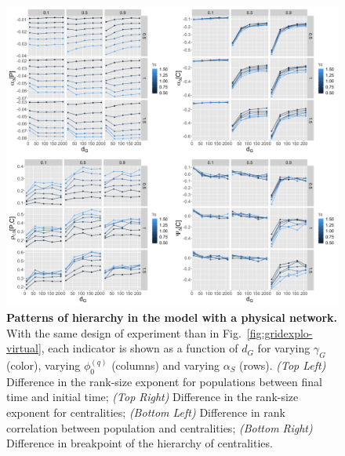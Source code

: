 \documentclass[11pt]{article}
\begin{document}
\begin{figure}
\includegraphics[width=\linewidth]{Fig3.png}
\caption{\textbf{Patterns of hierarchy in the model with a physical network.} With the same design of experiment than in Fig.~\ref{fig:gridexplo-virtual}, each indicator is shown as a function of $d_G$ for varying $\gamma_G$ (color), varying $\phi_0^{(q)}$ (columns) and varying $\alpha_S$ (rows). \textit{(Top Left)} Difference in the rank-size exponent for populations between final time and initial time; \textit{(Top Right)} Difference in the rank-size exponent for centralities; \textit{(Bottom Left)} Difference in rank correlation between population and centralities; \textit{(Bottom Right)} Difference in breakpoint of the hierarchy of centralities.\label{fig:gridexplo-physical}}
\end{figure}
\end{document}
